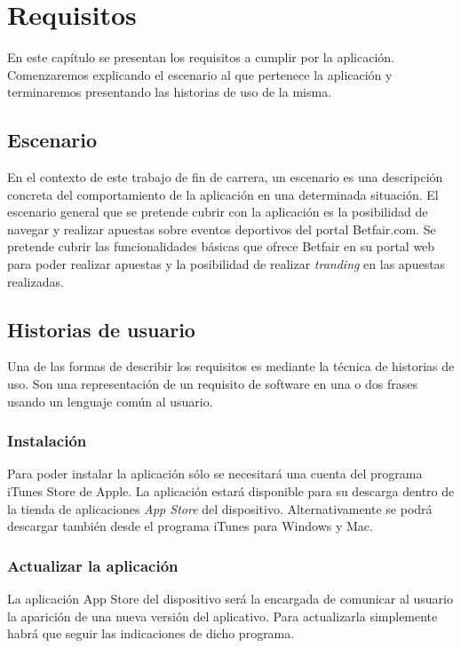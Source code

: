 \chapter{Requisitos}
\label{ch:requisitos}
En este capítulo se presentan los requisitos a cumplir por la aplicación. Comenzaremos explicando el escenario al que pertenece la aplicación y terminaremos presentando las historias de uso de la misma.
\section{Escenario}

En el contexto de este trabajo de fin de carrera, un escenario es una descripción concreta del comportamiento de la aplicación en una determinada situación. El escenario general que se pretende cubrir con la aplicación es la posibilidad de navegar y realizar apuestas sobre eventos deportivos del portal Betfair.com. Se pretende cubrir las funcionalidades básicas que ofrece Betfair en su portal web para poder realizar apuestas y la posibilidad de realizar \emph{tranding} en las apuestas realizadas.

\section{Historias de usuario}
 Una de las formas de describir los requisitos es mediante la técnica de historias de uso. Son una representación de un requisito de software en una o dos frases usando un lenguaje común al usuario.
 
\subsection{Instalación} Para poder instalar la aplicación sólo se necesitará una cuenta del programa iTunes Store de Apple. La aplicación estará disponible para su descarga dentro de la tienda de aplicaciones  \emph{App Store} del dispositivo.  Alternativamente se podrá descargar también desde el programa iTunes para Windows y Mac. 
\subsection{Actualizar la aplicación}
La aplicación  App Store  del dispositivo será la encargada de comunicar al usuario la aparición de una nueva versión del aplicativo. Para actualizarla simplemente habrá que seguir las indicaciones de dicho programa. %

